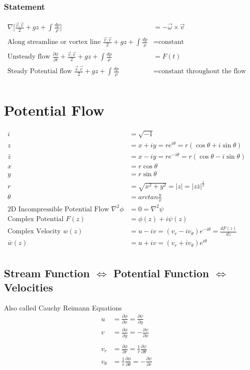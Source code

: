 \documentclass[11pt, letterpaper, notitlepage]{article}
\begin{document}
\subsubsection{Statement}
\begin{align*}
\nabla \Biggl[\frac{\vec{v}.\vec{v}}{2} + g z + \int \frac{dp}{\rho} \Biggr] &= -\vec{\omega} \times \vec{v} \\
\text{Along streamline or vortex line } \frac{\vec{v}.\vec{v}}{2} + g z + \int \frac{dp}{\rho} &= \text{constant}\\
\text{Unsteady flow } \frac{\partial \phi}{\partial t} + \frac{\vec{v}.\vec{v}}{2} + g z + \int \frac{dp}{\rho} &= F(t)\\
\text{Steady Potential flow } \frac{\vec{v}.\vec{v}}{2} + g z + \int \frac{dp}{\rho} &= \text{constant throughout the flow}\\
\end{align*}

\section{Potential Flow}
\begin{align*}
i &= \sqrt{-1} \\
z &= x + i y = r e^{i \theta} = r (\cos{\theta} + i \sin{\theta}) \\
\bar{z} &= x - i y = r e^{-i \theta} = r (\cos{\theta} - i \sin{\theta}) \\
x &= r \cos{\theta} \\
y &= r \sin{\theta} \\
r &= \sqrt{x^2 + y^2} = |z| = |z \bar{z}|^{\frac{1}{2}} \\
\theta &= arctan{\frac{y}{x}} \\
\text{2D Incompressible Potential Flow } \nabla^2 \phi &= 0 = \nabla^2 \psi \\
\text{Complex Potential\ } F(z) &= \phi(z) + i \psi(z) \\
\text{Complex Velocity\ } w(z) &= u - i v = (v_r - i v_{\theta}) e^{-i \theta} = \frac{dF(z)}{dz} \\
\bar{w}(z) &= u + i v = (v_r + i v_{\theta}) e^{i \theta} \\
\end{align*}


\subsection{Stream Function $\Leftrightarrow$ Potential Function $\Leftrightarrow$ Velocities}
Also called Cauchy Reimann Equations
\begin{align*}
u &= \frac{\partial \phi}{\partial x} = \frac{\partial \psi}{\partial y} \\
v &= \frac{\partial \phi}{\partial y} = -\frac{\partial \psi}{\partial x} \\ \\
v_r &= \frac{\partial \phi}{\partial r} = \frac{1}{r} \frac{\partial \psi}{\partial \theta} \\
v_{\theta} &= \frac{1}{r} \frac{\partial \phi}{\partial \theta} = -\frac{\partial \psi}{\partial r} \\
\end{align*}
\end{document}
